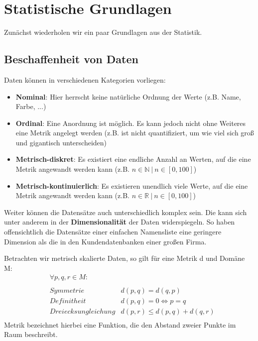 \section{Statistische Grundlagen}
Zunächst wiederholen wir ein paar Grundlagen aus der Statistik.

\subsection{Beschaffenheit von Daten}
Daten können in verschiedenen Kategorien vorliegen:
\begin{itemize}
	\item \textbf{Nominal}: Hier herrscht keine natürliche Ordnung der Werte (z.B. Name, Farbe, ...)
	\item \textbf{Ordinal}: Eine Anordnung ist möglich. Es kann jedoch nicht ohne Weiteres eine Metrik angelegt werden (z.B.  ist nicht quantifiziert, um wie viel sich groß und gigantisch unterscheiden)
	\item \textbf{Metrisch-diskret}: Es existiert eine endliche Anzahl an Werten, auf die eine Metrik angewandt werden kann (z.B. \({n\in \mathbb{N}\ |\ n \in [0,100]}\))
	\item \textbf{Metrisch-kontinuierlich}: Es existieren unendlich viele Werte, auf die eine Metrik angewandt werden kann (z.B. \({n\in \mathbb{R}\ |\ n \in [0,100]}\))
\end{itemize}
Weiter können die Datensätze auch unterschiedlich komplex sein. Die kann sich unter anderem in der \textbf{Dimensionalität} der Daten widerspiegeln. So haben offensichtlich die Datensätze einer einfachen Namensliste eine geringere Dimension als die  in den Kundendatenbanken einer großen Firma.

Betrachten wir metrisch skalierte Daten, so gilt für eine Metrik d und Domäne M:
\begin{align*}
	&\forall p,q,r \in M:&\\
	\\
	&Symmetrie &d(p,q)=d(q,p)\\
	&Definitheit &d(p,q)=0\Leftrightarrow p = q\\
	&Dreiecksungleichung &d(p,r)\leq d(p,q)+d(q,r)\\
\end{align*}
Metrik bezeichnet hierbei eine Funktion, die den Abstand zweier Punkte im Raum beschreibt.

